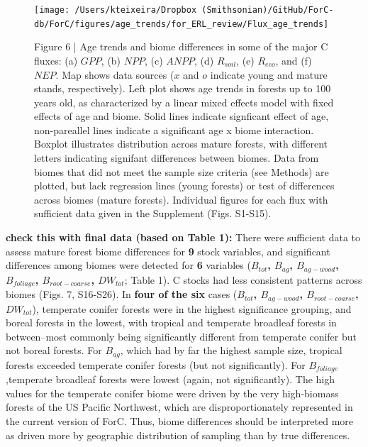 \documentclass[
]{article}
\begin{document}
\begin{figure}[H]

{\centering \texttt{[image: /Users/kteixeira/Dropbox (Smithsonian)/GitHub/ForC-db/ForC/figures/age\_trends/for\_ERL\_review/Flux\_age\_trends]} 

}

\caption{Figure 6 | Age trends and biome differences in some of the major C fluxes: (a) $GPP$, (b) $NPP$, (c) $ANPP$, (d) $R_{soil}$, (e) $R_{eco}$, and (f) $NEP$. Map shows data sources ($x$ and $o$ indicate young and mature stands, respectively). Left plot shows age trends in forests up to 100 years old, as characterized by a linear mixed effects model with fixed effects of age and biome. Solid lines indicate signficant effect of age, non-pareallel lines indicate a significant age x biome interaction. Boxplot illustrates distribution across mature forests, with different letters indicating signifant differences between biomes. Data from biomes that did not meet the sample size criteria (see Methods) are plotted, but lack regression lines (young forests) or test of differences across biomes (mature forests). Individual figures for each flux with sufficient data given in the Supplement (Figs. S1-S15).}\label{fig:unnamed-chunk-12}
\end{figure}

\textbf{check this with final data (based on Table 1):} There were
sufficient data to assess mature forest biome differences for \textbf{9}
stock variables, and significant differences among biomes were detected
for \textbf{6} variables (\textbf{\(B_{tot}\), \(B_{ag}\),
\(B_{ag-wood}\), \(B_{foliage}\), \(B_{root-coarse}\), \(DW_{tot}\)};
Table 1). C stocks had less consistent patterns across biomes (Figs. 7,
S16-S26). In \textbf{four of the six} cases (\textbf{\(B_{tot}\),
\(B_{ag-wood}\), \(B_{root-coarse}\), \(DW_{tot}\)}), temperate conifer
forests were in the highest significance grouping, and boreal forests in
the lowest, with tropical and temperate broadleaf forests in
between--most commonly being significantly different from temperate
conifer but not boreal forests. For \(B_{ag}\), which had by far the
highest sample size, tropical forests exceeded temperate conifer forests
(but not significantly). For \(B_{foliage}\),temperate broadleaf forests
were lowest (again, not significantly). The high values for the
temperate conifer biome were driven by the very high-biomass forests of
the US Pacific Northwest, which are disproportionately represented in
the current version of ForC. Thus, biome differences should be
interpreted more as driven more by geographic distribution of sampling
than by true differences.
\end{document}
